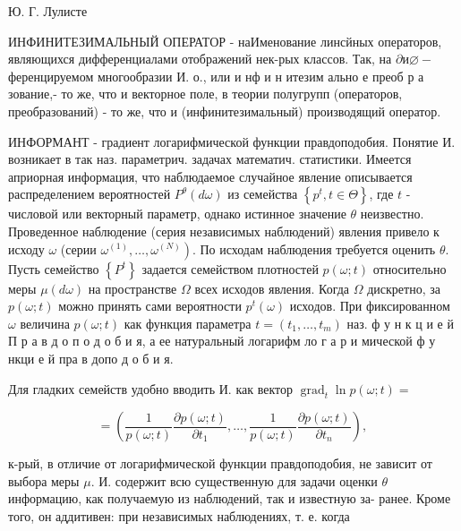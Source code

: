 \documentclass[10pt]{article}
\begin{document}
Ю. Г. Лулисте



ИНФИНИТЕЗИМАЛЬНЫЙ ОПЕРАТОР - наИменование линсйных операторов, являющихся дифференциалами отображений нек-рых классов. Так, на $\partial и \varnothing-$ ференцируемом многообразии И. о., или и нф и н итезим ально е преоб р а зование,- то же, что и векторное поле, в теории полугрупп (операторов, преобразований) - то же, что и (инфинитезимальный) производящий оператор.



ИНФОРМАНТ - градиент логарифмической функции правдоподобия. Понятие И. возникает в так наз. параметрич. задачах математич. статистики. Имеется априорная информация, что наблюдаемое случайное явление описывается распределением вероятностей $P^{\theta}(d \omega)$ из семейства $\left\{p^{t}, t \in \Theta\right\}$, где $t$ - числовой или векторный параметр, однако истинное значение $\theta$ неизвестно. Проведенное наблюдение (серия независимых наблюдений) явления привело к исходу $\omega$ (серии $\left.\omega^{(1)}, \ldots, \omega^{(N)}\right)$. По исходам наблюдения требуется оценить $\theta$. Пусть семейство $\left\{P^{t}\right\}$ задается семейством плотностей $p(\omega ; t)$ относительно меры $\mu(d \omega)$ на пространстве $\Omega$ всех исходов явления. Когда $\Omega$ дискретно, за $p(\omega ; t)$ можно принять сами вероятности $p^{t}(\omega)$ исходов. При фиксированном $\omega$ величина $p(\omega ; t)$ как функция параметра $t=\left(t_{1}, \ldots, t_{m}\right)$ наз. ф у н к ц и е й П р а в д о п о д о б и я, а ее натуральный логарифм ло г а р и мической ф у нкци е й пра в допо д о б и я.



Для гладких семейств удобно вводить И. как вектор $\operatorname{grad}_{t} \ln p(\omega ; t)=$



\[

=\left(\frac{1}{p(\omega ; t)} \frac{\partial p(\omega ; t)}{\partial t_{1}}, \ldots, \frac{1}{p(\omega ; t)} \frac{\partial p(\omega ; t)}{\partial t_{n}}\right) \text {, }

\]



к-рый, в отличие от логарифмической функции правдоподобия, не зависит от выбора меры $\mu$. И. содержит всю существенную для задачи оценки $\theta$ информацию, как получаемую из наблюдений, так и известную за- ранее. Кроме того, он аддитивен: при независимых наблюдениях, т. е. когда
\end{document}
